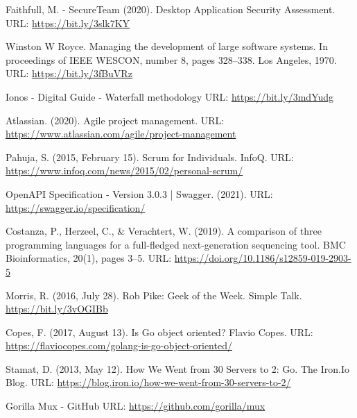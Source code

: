 \begin{thebibliography}{00}
    
 Faithfull, M. - SecureTeam (2020). Desktop Application Security Assessment.
\newline
URL: \url{https://bit.ly/3slk7KY}

 Winston W Royce. Managing the development of large software systems. In proceedings of IEEE WESCON, number 8,
pages 328–338. Los Angeles, 1970.
\newline
URL: \url{https://bit.ly/3fBuVRz}

 Ionos - Digital Guide - Waterfall methodology
\newline
URL: \url{https://bit.ly/3mdYudg}

 Atlassian. (2020). Agile project management.
\newline
URL: \url{https://www.atlassian.com/agile/project-management}

 Pahuja, S. (2015, February 15). Scrum for Individuals. InfoQ.
\newline
URL: \url{https://www.infoq.com/news/2015/02/personal-scrum/}

 OpenAPI Specification - Version 3.0.3 | Swagger. (2021). 
\newline
URL: \url{https://swagger.io/specification/}

 Costanza, P., Herzeel, C., \& Verachtert, W. (2019). A comparison of three programming languages for a full-fledged next-generation sequencing tool. BMC Bioinformatics, 20(1), pages 3–5. 
\newline
URL: \url{https://doi.org/10.1186/s12859-019-2903-5}

 Morris, R. (2016, July 28). Rob Pike: Geek of the Week. Simple Talk.
\url{https://bit.ly/3vOGIBb}

 Copes, F. (2017, August 13). Is Go object oriented? Flavio Copes.
\newline
URL: \url{https://flaviocopes.com/golang-is-go-object-oriented/}

 Stamat, D. (2013, May 12). How We Went from 30 Servers to 2: Go. The Iron.Io Blog.
\newline 
URL: \url{https://blog.iron.io/how-we-went-from-30-servers-to-2/}

 Gorilla Mux - GitHub
\newline
URL: \url{https://github.com/gorilla/mux}


\end{thebibliography}
